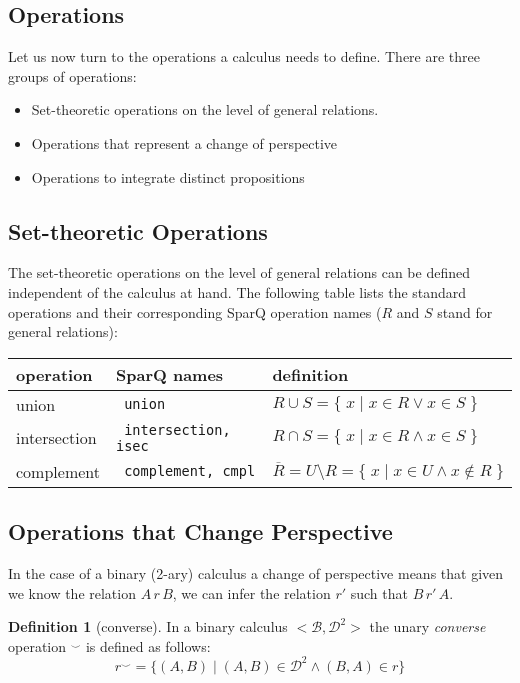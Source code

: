 \documentclass[headsepline]{scrreprt}
\theoremstyle{definition}
\newtheorem{defn}{Definition}
\newcommand{\engine}{SparQ}
\begin{document}
\subsection{Operations}\label{sec:operations}

Let us now turn to the operations a calculus needs to define.
There are three groups of operations:
\begin{itemize}
	\item Set-theoretic operations on the level of general relations.
	\item Operations that represent a change of perspective
	\item Operations to integrate distinct propositions
\end{itemize}

\subsection{Set-theoretic Operations}
The set-theoretic operations on the level of general relations
can be defined independent of the calculus at hand. The following table lists the standard operations and
their corresponding \engine{} operation names ($R$ and $S$ stand for general relations):

\begin{tabular}{|l|l|l|}\hline
{\bfseries operation} & {\bfseries \engine{} names} & {\bfseries definition} \\ \hline \hline
union & \texttt{ union} & $R \cup S = \{\; x\; |\; x \in R \vee x \in S\;\}$\\
intersection & \texttt{ intersection, isec} & $R \cap S = \{\; x\; |\; x \in R \wedge x \in S\;\}$\\
complement & \texttt{ complement, cmpl}&  $\overline{R} = U \setminus R = \{\; x\; |\; x \in U \wedge x \not\in R\; \}$\\ \hline
\end{tabular}


\subsection{Operations that Change Perspective}
In the case of a binary (2-ary) calculus a change of perspective means that given we know the relation $A\, r \, B$, we can infer the relation $r'$ such that $B\, r'\, A$.

\begin{defn}[converse]
	In a binary calculus $<\mathcal{B},\mathcal{D}^2>$ the unary {\em converse} operation $^{\smile}$ is defined as follows:
	$$ r^{\smile} = \{ (A,B)\; |\; (A,B) \in \mathcal{D}^2 \wedge (B,A) \in r \}$$
\end{defn}
\end{document}
